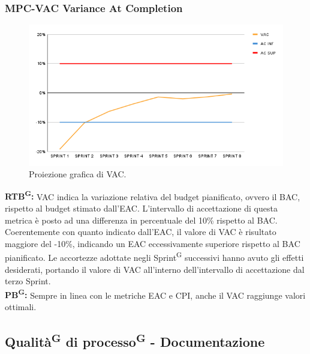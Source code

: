 \documentclass[8pt]{article}
\newcommand{\glossterm}[1]{#1\textsuperscript{G}} %
\begin{document}
\subsubsection{MPC-VAC Variance At Completion}
\begin{figure}[h!]
    \centering
    \includegraphics[width=1\textwidth]{images_pdq/VAC.png}
    \caption{Proiezione grafica di VAC.}
    \label{fig:Proiezione grafica di VAC}
\end{figure}
\textbf{\glossterm{RTB}:} VAC indica la variazione relativa del budget pianificato, ovvero il BAC, rispetto al budget stimato dall'EAC. L'intervallo di accettazione di questa metrica è posto ad una differenza in percentuale del 10\% rispetto al BAC.\\
Coerentemente con quanto indicato dall'EAC, il valore di VAC è risultato maggiore del -10\%, indicando un EAC eccessivamente superiore rispetto al BAC pianificato. Le accortezze adottate negli \glossterm{Sprint} successivi hanno avuto gli effetti desiderati, portando il valore di VAC all'interno dell'intervallo di accettazione dal terzo Sprint.\\
\textbf{\glossterm{PB}:} Sempre in linea con le metriche EAC e CPI, anche il VAC raggiunge valori ottimali.
\clearpage
\subsection{\glossterm{Qualità} di \glossterm{processo} - Documentazione}
\end{document}
